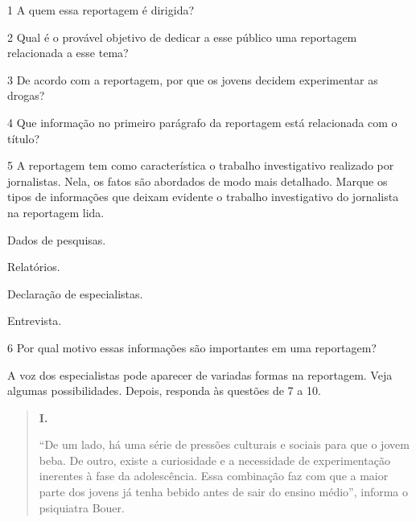 \num{1} A quem essa reportagem é dirigida?


\num{2} Qual é o provável objetivo de dedicar a esse público uma
reportagem relacionada a esse tema?


\num{3} De acordo com a reportagem, por que os jovens decidem
experimentar as drogas?


\num{4} Que informação no primeiro parágrafo da reportagem está
relacionada com o título?


\num{5} A reportagem tem como característica o trabalho investigativo
realizado por jornalistas. Nela, os fatos são abordados de modo mais
detalhado. Marque os tipos de informações que deixam evidente o trabalho
investigativo do jornalista na reportagem lida.

\begin{boxlist}
 Dados de pesquisas.

 Relatórios.

 Declaração de especialistas.

 Entrevista.
\end{boxlist}

\num{6} Por qual motivo essas informações são importantes em uma
reportagem?


A voz dos especialistas pode aparecer de variadas formas na reportagem.
Veja algumas possibilidades. Depois, responda às questões de 7 a 10.

\begin{quote}
\textbf{I.}

“De um lado, há uma série de pressões culturais e sociais para que o
jovem beba. De outro, existe a curiosidade e a necessidade de
experimentação inerentes à fase da adolescência. Essa combinação faz com
que a maior parte dos jovens já tenha bebido antes de sair do ensino
médio”, informa o psiquiatra Bouer.
\end{quote}

